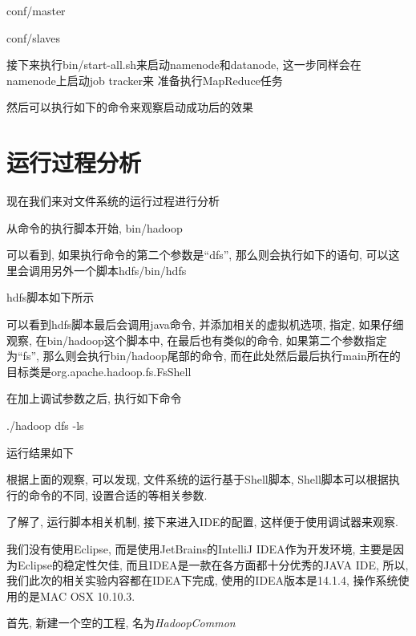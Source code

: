 conf/master


conf/slaves


接下来执行bin/start-all.sh来启动namenode和datanode, 这一步同样会在namenode上启动job tracker来
准备执行MapReduce任务


然后可以执行如下的命令来观察启动成功后的效果

\section{运行过程分析}

现在我们来对{\Hadoop}文件系统的运行过程进行分析

从{\Hadoop}命令的执行脚本开始, bin/hadoop


可以看到, 如果执行命令的第二个参数是``dfs'', 那么则会执行如下的语句, 可以这里会调用另外一个脚本hdfs/bin/hdfs


hdfs脚本如下所示


可以看到hdfs脚本最后会调用java命令, 并添加相关的虚拟机选项, 指定{\CPATH}, 如果仔细观察, 在bin/hadoop这个脚本中, 在最后也有类似的命令, 如果第二个参数指定为``fs'', 那么则会执行bin/hadoop尾部的命令, 而在此处然后最后执行main所在的目标类是org.apache.hadoop.fs.FsShell


在加上调试参数之后, 执行如下命令

	 ./hadoop dfs -ls

运行结果如下


根据上面的观察, 可以发现, {\Hadoop}文件系统的运行基于Shell脚本,
Shell脚本可以根据执行的命令的不同, 设置合适的{\CPATH}等相关参数.

了解了{\Hadoop}, 运行脚本相关机制, 接下来进入IDE的配置, 这样便于使用调试器来观察.

我们没有使用Eclipse, 而是使用JetBrains的IntelliJ IDEA作为开发环境,
主要是因为Eclipse的稳定性欠佳, 而且IDEA是一款在各方面都十分优秀的JAVA IDE,
所以, 我们此次的相关实验内容都在IDEA下完成, 使用的IDEA版本是14.1.4,
操作系统使用的是MAC OSX 10.10.3.

首先, 新建一个空的工程, 名为\emph{HadoopCommon}


